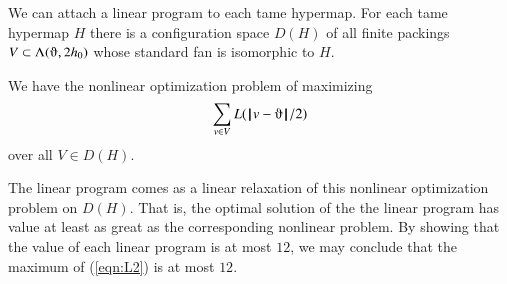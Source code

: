 We can attach a linear program to each tame hypermap.
For each tame hypermap $H$ there is a configuration space $D(H)$ of all
finite packings $V\subset \Lambda(\orgn,2\hm)$ whose standard fan is
isomorphic to $H$.

We have the nonlinear optimization problem of maximizing
\begin{equation}\label{eqn:L2}
\sum_{v\in V} L(\norm{v}{\orgn}/2)
\end{equation}
over all $V\in D(H)$.

The linear program comes as a linear relaxation of this nonlinear
optimization problem on $D(H)$. That is, the optimal solution of the
the linear program has value at least as great as the corresponding
nonlinear problem.  By showing that the value of each linear program
is at most $12$, we may conclude that the maximum of (\ref{eqn:L2})
is at most $12$.


